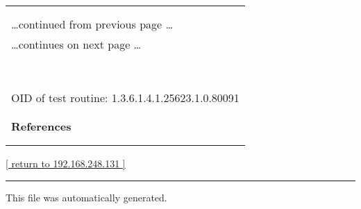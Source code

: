 \documentclass{article}
\begin{document}
\begin{longtable}{|p{}|}
\hline
\rowcolor{openvas_warning}{\color{white}{Medium (CVSS: 2.6) }}\\
\rowcolor{openvas_warning}{\color{white}{NVT: TCP timestamps}}\\
\hline
\endfirsthead
\hfill\ldots continued from previous page \ldots \\
\hline
\endhead
\hline
\ldots continues on next page \ldots \\
\endfoot
\hline
\endlastfoot
\\
\rowcolor{white}{\verb=It was detected that the host implements RFC1323.=}\\
\rowcolor{white}{\verb=The following timestamps were retrieved with a delay of 1 seconds in-between:=}\\
\rowcolor{white}{\verb=Paket 1: 831744=}\\
\rowcolor{white}{\verb=Paket 2: 831845=}\\
\rowcolor{white}{\verb==}\\
\rowcolor{white}{\verb==}\\
\\
OID of test routine: 1.3.6.1.4.1.25623.1.0.80091\\
\\

      \hline
      \\
\textbf{References}\\
\rowcolor{white}{\verb=Other:=}\\
\rowcolor{white}{\verb=  URL:http://www.ietf.org/rfc/rfc1323.txt=}\\
\end{longtable}

\begin{footnotesize}\hyperref[host:192.168.248.131]{[ return to 192.168.248.131 ]}\end{footnotesize}

\begin{center}
\medskip
\rule{\textwidth}{0.1pt}

This file was automatically generated.
\end{center}
\end{document}

